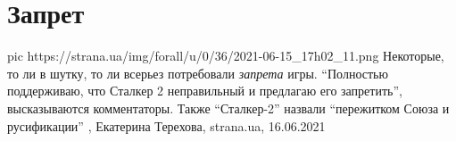  
 
 
 
 
\chapter{Запрет}

\ifcmt
  pic https://strana.ua/img/forall/u/0/36/2021-06-15_17h02_11.png
\fi
Некоторые, то ли в шутку, то ли всерьез потребовали \emph{запрета} игры. 
\enquote{Полностью поддерживаю, что Сталкер 2 неправильный и предлагаю его запретить}, высказываются комментаторы.
Также \enquote{Сталкер-2} назвали \enquote{пережитком Союза и русификации}
, 
Екатерина Терехова, strana.ua, 16.06.2021
